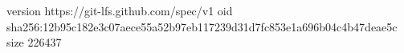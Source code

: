 version https://git-lfs.github.com/spec/v1
oid sha256:12b95c182e3c07aece55a52b97eb117239d31d7fc853e1a696b04c4b47deae5c
size 226437
